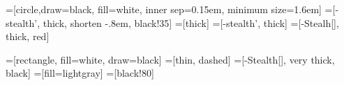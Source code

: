 \usetikzlibrary{arrows}

=[circle,draw=black, fill=white, inner sep=0.15em, minimum size=1.6em]
=[-stealth', thick, shorten -.8em, black!35]
=[thick]
=[-stealth', thick]
=[{}-{Stealh[]}, thick, red]

=[rectangle, fill=white, draw=black]
=[thin, dashed]
=[-{Stealth[]}, very thick, black]
=[fill=lightgray]
=[black!80]
